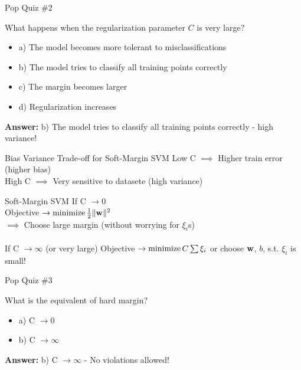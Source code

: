 \documentclass{beamer}
\begin{document}
{
	
}

\begin{frame}{Pop Quiz \#2}
\begin{tcolorbox}[colback=blue!5!white,colframe=blue!75!black,title=Quick Question!]
What happens when the regularization parameter $C$ is very large?
\begin{itemize}
	\item a) The model becomes more tolerant to misclassifications
	\item b) The model tries to classify all training points correctly
	\item c) The margin becomes larger
	\item d) Regularization increases
\end{itemize}
\pause
\textbf{Answer:} b) The model tries to classify all training points correctly - high variance!
\end{tcolorbox}
\end{frame}

\begin{frame}{Bias Variance Trade-off for Soft-Margin SVM}
	Low C $\implies$ Higher train error (higher bias) \\
	\vspace{1cm}
	High C $\implies$ Very sensitive to datasete (high variance) \\
\end{frame}

	\begin{frame}{Soft-Margin SVM}
		If C $\rightarrow 0$ \\
		\hspace{0.3cm} Objective $\rightarrow \operatorname{minimize} \frac{1}{2}\|\mathbf{w}\|^{2}$ \\
		\hspace{0.3cm} $\implies$ Choose large margin (without worrying for $\xi_{i}$s) \\
		\vspace{0.4cm}
		\hspace{2cm} \\
		
		If C $\rightarrow \infty$ (or very large) 
		\hspace{0.3cm} Objective $\rightarrow \operatorname{minimize} C\sum\xi_{i}$ or choose $\mathbf{w}$, $b$, s.t. $\xi_{i}$ is small!
	\end{frame}
	\begin{frame}{Pop Quiz \#3}
	\begin{tcolorbox}[colback=blue!5!white,colframe=blue!75!black,title=Quick Question!]
	What is the equivalent of hard margin?
	\begin{itemize}
		\item a) C $\rightarrow 0$
		\item b) C $\rightarrow \infty$
	\end{itemize}
	\pause
	\textbf{Answer:} b) C $\rightarrow \infty$ - No violations allowed!
	\end{tcolorbox}
	\end{frame}
	
\end{document}
